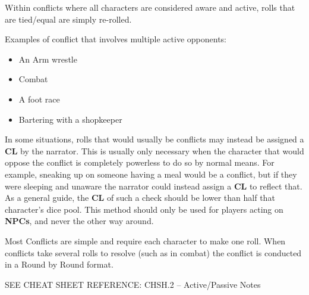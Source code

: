 Within conflicts where all characters are considered aware and active, rolls that are tied/equal are simply re-rolled.

Examples of conflict that involves multiple active opponents:
\begin{itemize}
    \item An Arm wrestle
    \item Combat
    \item A foot race
    \item Bartering with a shopkeeper
\end{itemize}

In some situations, rolls that would usually be conflicts may instead be assigned a \textbf{CL} by the narrator. This is usually only necessary when the character that would oppose the conflict is completely powerless to do so by normal means. For example, sneaking up on someone having a meal would be a conflict, but if they were sleeping and unaware the narrator could instead assign a \textbf{CL} to reflect that. As a general guide, the \textbf{CL} of such a check should be lower than half that character's dice pool. This method should only be used for players acting on \textbf{NPCs}, and never the other way around.

Most Conflicts are simple and require each character to make one roll. When conflicts take several rolls to resolve (such as in combat) the conflict is conducted in a Round by Round format.

SEE CHEAT SHEET REFERENCE: CHSH.2 – Active/Passive Notes